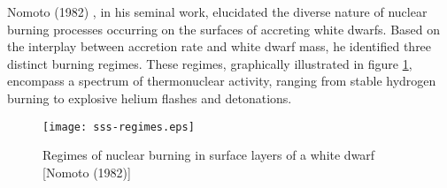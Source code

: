         	Nomoto (1982) \cite{nomoto82}, in his seminal work, elucidated the diverse nature of nuclear burning processes occurring on the surfaces of accreting white dwarfs. Based on the interplay between accretion rate and white dwarf mass, he identified three distinct burning regimes. These regimes, graphically illustrated in figure \ref{fig:regimes-wd}, encompass a spectrum of thermonuclear activity, ranging from stable hydrogen burning to explosive helium flashes and detonations.
        	
        	\begin{figure}[h!]
        		\begin{center}
        			\texttt{[image: sss-regimes.eps]}
        			\caption{Regimes of nuclear burning in surface layers of a white dwarf [Nomoto (1982)]}
        			\label{fig:regimes-wd}
        		\end{center}
        	\end{figure}
        	
